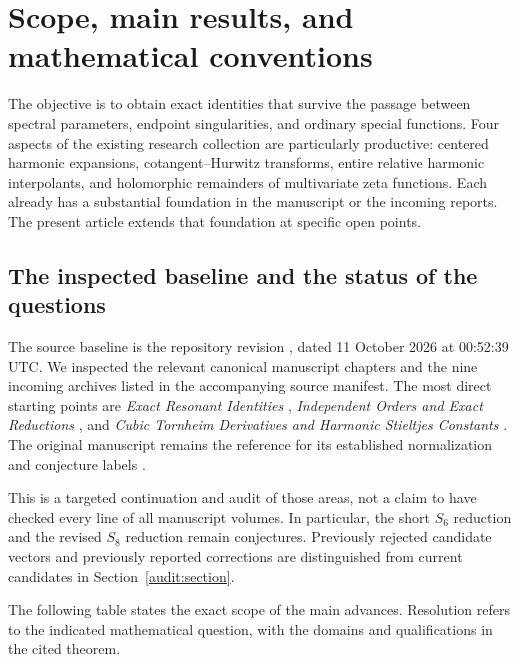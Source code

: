 \section{Scope, main results, and mathematical conventions}
\label{scope:section}

The objective is to obtain exact identities that survive the passage
between spectral parameters, endpoint singularities, and ordinary
special functions. Four aspects of the existing research collection
are particularly productive: centered harmonic expansions,
cotangent--Hurwitz transforms, entire relative harmonic interpolants,
and holomorphic remainders of multivariate zeta functions. Each already
has a substantial foundation in the manuscript or the incoming reports.
The present article extends that foundation at specific open points.

\subsection{The inspected baseline and the status of the questions}

The source baseline is the repository revision \snapshot,
dated 11 October 2026 at 00:52:39 UTC. We inspected the relevant
canonical manuscript chapters and the nine incoming archives listed
in the accompanying source manifest. The most direct starting points
are \emph{Exact Resonant Identities} \cite{ghp:ExactResonant},
\emph{Independent Orders and Exact Reductions} \cite{qtr:Independent},
and \emph{Cubic Tornheim Derivatives and Harmonic Stieltjes
Constants} \cite{source:Cubic}. The original manuscript remains
the reference for its established normalization and conjecture labels
\cite{source:manuscript}.

This is a targeted continuation and audit of those areas, not a claim
to have checked every line of all manuscript volumes. In particular,
the short $S_6$ reduction and the revised $S_8$ reduction remain
conjectures. Previously rejected candidate vectors and previously
reported corrections are distinguished from current candidates in
Section~\ref{audit:section}.

The following table states the exact scope of the main advances.
Resolution refers to the indicated mathematical question, with the
domains and qualifications in the cited theorem.

